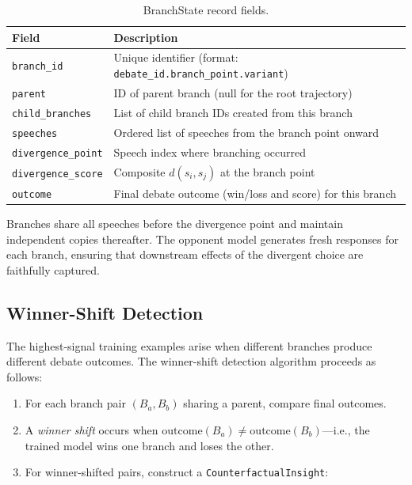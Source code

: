 \begin{table}[h]
\centering
\small
\begin{tabular}{lp{8cm}}
\toprule
\textbf{Field} & \textbf{Description} \\
\midrule
\texttt{branch\_id} & Unique identifier (format: \texttt{debate\_id.branch\_point.variant}) \\
\texttt{parent} & ID of parent branch (null for the root trajectory) \\
\texttt{child\_branches} & List of child branch IDs created from this branch \\
\texttt{speeches} & Ordered list of speeches from the branch point onward \\
\texttt{divergence\_point} & Speech index where branching occurred \\
\texttt{divergence\_score} & Composite $d(s_i, s_j)$ at the branch point \\
\texttt{outcome} & Final debate outcome (win/loss and score) for this branch \\
\bottomrule
\end{tabular}
\caption{BranchState record fields.}
\label{tab:branch_state}
\end{table}

Branches share all speeches before the divergence point and maintain
independent copies thereafter. The opponent model generates fresh
responses for each branch, ensuring that downstream effects of the
divergent choice are faithfully captured.

\subsection{Winner-Shift Detection}

The highest-signal training examples arise when different branches
produce different debate outcomes. The winner-shift detection algorithm
proceeds as follows:

\begin{enumerate}
\item For each branch pair $(B_a, B_b)$ sharing a parent, compare final outcomes.
\item A \emph{winner shift} occurs when $\text{outcome}(B_a) \neq \text{outcome}(B_b)$---i.e., the trained model wins one branch and loses the other.
\item For winner-shifted pairs, construct a \texttt{CounterfactualInsight}:
\end{enumerate}

